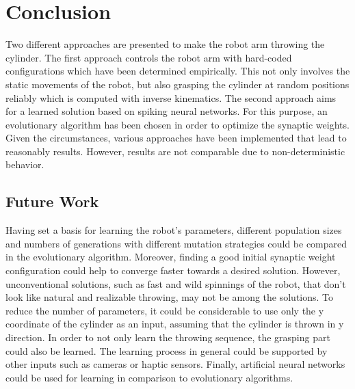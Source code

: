 \section{Conclusion}
\label{sec:conclusion}
\todo{}
Two different approaches are presented to make the robot arm throwing the cylinder.
The first approach controls the robot arm with hard-coded configurations which have been determined empirically.
This not only involves the static movements of the robot, but also grasping the cylinder at random positions reliably which is computed with inverse kinematics.
The second approach aims for a learned solution based on spiking neural networks.
For this purpose, an evolutionary algorithm has been chosen in order to optimize the synaptic weights.
Given the circumstances, various approaches have been implemented that lead to reasonably results.
However, results are not comparable due to non-deterministic behavior.

\subsection{Future Work} %
\label{sub:future_work}
\todo{}
Having set a basis for learning the robot's parameters, different population sizes and numbers of generations with different mutation strategies could be compared in the evolutionary algorithm.
Moreover, finding a good initial synaptic weight configuration could help to converge faster towards a desired solution.
However, unconventional solutions, such as fast and wild spinnings of the robot, that don't look like natural and realizable throwing, may not be among the solutions.
To reduce the number of parameters, it could be considerable to use only the y coordinate of the cylinder as an input, assuming that the cylinder is thrown in y direction.
In order to not only learn the throwing sequence, the grasping part could also be learned.
The learning process in general could be supported by other inputs such as cameras or haptic sensors.
Finally, artificial neural networks could be used for learning in comparison to evolutionary algorithms.

